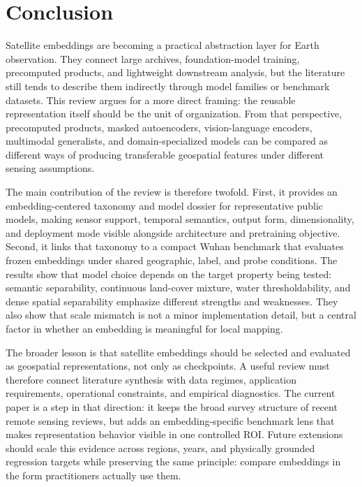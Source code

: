 \section{Conclusion}

Satellite embeddings are becoming a practical abstraction layer for Earth observation. They connect large archives, foundation-model training, precomputed products, and lightweight downstream analysis, but the literature still tends to describe them indirectly through model families or benchmark datasets. This review argues for a more direct framing: the reusable representation itself should be the unit of organization. From that perspective, precomputed products, masked autoencoders, vision-language encoders, multimodal generalists, and domain-specialized models can be compared as different ways of producing transferable geospatial features under different sensing assumptions.

The main contribution of the review is therefore twofold. First, it provides an embedding-centered taxonomy and model dossier for \modelcount{} representative public models, making sensor support, temporal semantics, output form, dimensionality, and deployment mode visible alongside architecture and pretraining objective. Second, it links that taxonomy to a compact Wuhan benchmark that evaluates frozen embeddings under shared geographic, label, and probe conditions. The results show that model choice depends on the target property being tested: semantic separability, continuous land-cover mixture, water thresholdability, and dense spatial separability emphasize different strengths and weaknesses. They also show that scale mismatch is not a minor implementation detail, but a central factor in whether an embedding is meaningful for local mapping.

The broader lesson is that satellite embeddings should be selected and evaluated as geospatial representations, not only as checkpoints. A useful review must therefore connect literature synthesis with data regimes, application requirements, operational constraints, and empirical diagnostics. The current paper is a step in that direction: it keeps the broad survey structure of recent remote sensing reviews, but adds an embedding-specific benchmark lens that makes representation behavior visible in one controlled ROI. Future extensions should scale this evidence across regions, years, and physically grounded regression targets while preserving the same principle: compare embeddings in the form practitioners actually use them.
